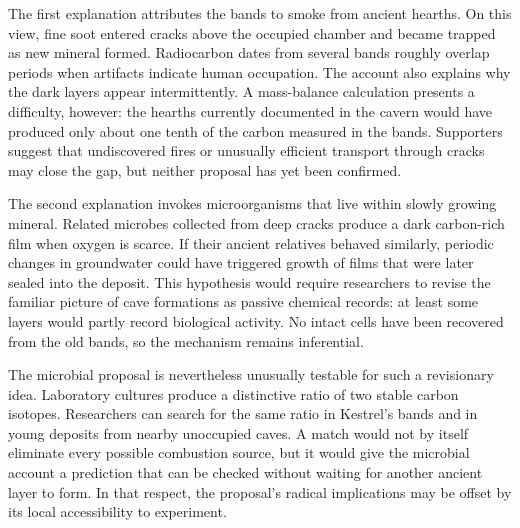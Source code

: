 The first explanation attributes the bands to smoke from ancient hearths. On this view,
fine soot entered cracks above the occupied chamber and became trapped as new mineral formed.
Radiocarbon dates from several bands roughly overlap periods when artifacts indicate human
occupation. The account also explains why the dark layers appear intermittently. A mass-balance
calculation presents a difficulty, however: the hearths currently documented in the cavern
would have produced only about one tenth of the carbon measured in the bands. Supporters
suggest that undiscovered fires or unusually efficient transport through cracks may close
the gap, but neither proposal has yet been confirmed.

The second explanation invokes microorganisms that live within slowly growing mineral.
Related microbes collected from deep cracks produce a dark carbon-rich film when oxygen is
scarce. If their ancient relatives behaved similarly, periodic changes in groundwater could
have triggered growth of films that were later sealed into the deposit. This hypothesis
would require researchers to revise the familiar picture of cave formations as passive
chemical records: at least some layers would partly record biological activity. No intact
cells have been recovered from the old bands, so the mechanism remains inferential.

The microbial proposal is nevertheless unusually testable for such a revisionary idea.
Laboratory cultures produce a distinctive ratio of two stable carbon isotopes. Researchers
can search for the same ratio in Kestrel's bands and in young deposits from nearby unoccupied
caves. A match would not by itself eliminate every possible combustion source, but it would
give the microbial account a prediction that can be checked without waiting for another
ancient layer to form. In that respect, the proposal's radical implications may be offset
by its local accessibility to experiment.

